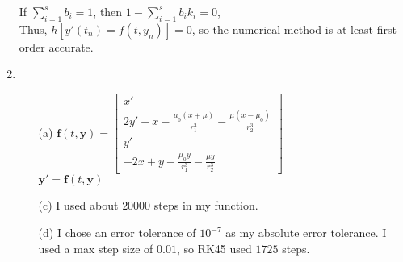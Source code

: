\documentclass[10pt]{article}
\begin{document}
\begin{enumerate}[label=\bf{Problem \arabic*}.]
    If $\sum_{i=1}^{s} b_i=1$, then $1-\sum_{i=1}^{s} b_i k_i=0$,\\
    Thus, $h[y'(t_n)=f(t,y_n)]=0$, so the numerical method is at least first order accurate. 
    \item \begin{enumerate}
        \item [(a)] $\mathbf{f}(t,\mathbf{y})=\begin{bmatrix}
            x'\\
            2y'+x-\frac{\mu_0(x+\mu)}{r_1^3}-\frac{\mu(x-\mu_0)}{r_2^3}\\
            y'\\
            -2x+y-\frac{\mu_0y}{r_1^3}-\frac{\mu y}{r_2^3}
        \end{bmatrix}$\\
        $\mathbf{y}'=\mathbf{f}(t,\mathbf{y})$
        \item [(c)] I used about $20000$ steps in my function. 
        \item [(d)] I chose an error tolerance of $10^{-7}$ as my absolute error tolerance. 
        I used a max step size of $0.01$, so RK45 used $1725$ steps. 
        
        
    \end{enumerate}
    
\end{enumerate}
\end{document}
